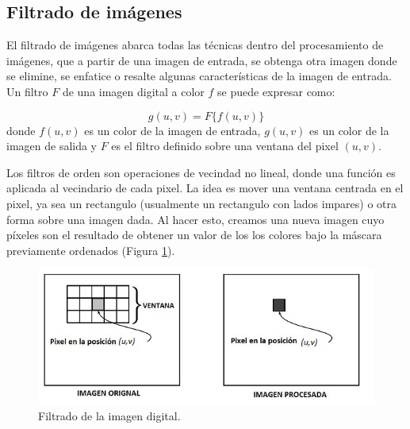 	




\subsection{Filtrado  de im\'agenes}
El filtrado de im\'agenes abarca todas las t\'ecnicas dentro del procesamiento de im\'agenes, que a partir de una imagen de entrada, se obtenga otra imagen donde se elimine, se enfatice o resalte algunas caracter\'isticas de la imagen de entrada. 
Un filtro $F$ de una imagen digital a color $f$ se puede expresar como:

\begin{equation}
\label{Filtrado} 
      g(u,v) = F\{f(u,v)\}
\end{equation}
donde $f(u,v)$ es un color de la imagen de entrada, $g(u,v)$ es un color de la imagen de salida y $F$ es el filtro definido sobre una ventana del pixel $(u,v)$.


Los filtros de orden son operaciones de vecindad no lineal, donde una funci\'on es aplicada al vecindario de cada pixel. La idea es mover una ventana centrada en el pixel, ya sea un rectangulo (usualmente un rectangulo con lados impares) o otra forma sobre una imagen dada. Al hacer esto, creamos una nueva imagen cuyo p\'ixeles son el resultado de obtener un valor de los los colores bajo la m\'ascara previamente ordenados (Figura \ref{fig:Filt}). 


\begin{figure}[htbp]
	\centering
		\includegraphics[scale=0.5]{fig/Filt.jpg}
	\caption{Filtrado de la imagen digital.}
	\label{fig:Filt}
\end{figure}



